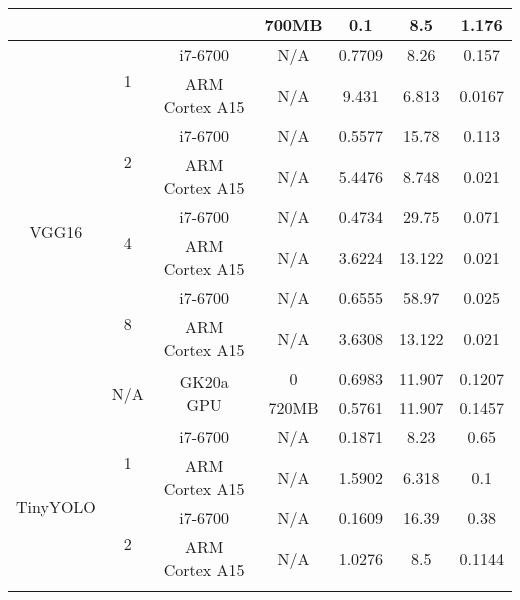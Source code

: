 \begin{table}[H]
\begin{center}
\begin{tabular}[center]{ | c | c | c | c | c | c | c | }
                                  &                       &                             & 700MB   & 0.1     & 8.5     & 1.176   \\ \hline
      \multirow{10}{*}{VGG16}     & \multirow{2}{*}{1}    & i7-6700                     & N/A     & 0.7709  & 8.26    & 0.157   \\ \cline{3-7}
                                  &                       & ARM Cortex A15              & N/A     & 9.431   & 6.813   & 0.0167  \\ \cline{2-7}
                                  & \multirow{2}{*}{2}    & i7-6700                     & N/A     & 0.5577  & 15.78   & 0.113   \\ \cline{3-7}
                                  &                       & ARM Cortex A15              & N/A     & 5.4476  & 8.748   & 0.021   \\ \cline{2-7}
                                  & \multirow{2}{*}{4}    & i7-6700                     & N/A     & 0.4734  & 29.75   & 0.071   \\ \cline{3-7}
                                  &                       & ARM Cortex A15              & N/A     & 3.6224  & 13.122  & 0.021   \\ \cline{2-7}
                                  & \multirow{2}{*}{8}    & i7-6700                     & N/A     & 0.6555  & 58.97   & 0.025   \\ \cline{3-7}
                                  &                       & ARM Cortex A15              & N/A     & 3.6308  & 13.122  & 0.021   \\ \cline{2-7}
                                  & \multirow{2}{*}{N/A}  & \multirow{2}{*}{GK20a GPU}  & 0       & 0.6983  & 11.907  & 0.1207  \\ \cline{4-7}
                                  &                       &                             & 720MB   & 0.5761  & 11.907  & 0.1457  \\ \hline
      \multirow{10}{*}{TinyYOLO}  & \multirow{2}{*}{1}    & i7-6700                     & N/A     & 0.1871  & 8.23    & 0.65    \\ \cline{3-7}
                                  &                       & ARM Cortex A15              & N/A     & 1.5902  & 6.318   & 0.1     \\ \cline{2-7}
                                  & \multirow{2}{*}{2}    & i7-6700                     & N/A     & 0.1609  & 16.39   & 0.38    \\ \cline{3-7}
                                  &                       & ARM Cortex A15              & N/A     & 1.0276  & 8.5     & 0.1144  \\ \cline{2-7}

\end{tabular}
\end{center}
\end{table}
